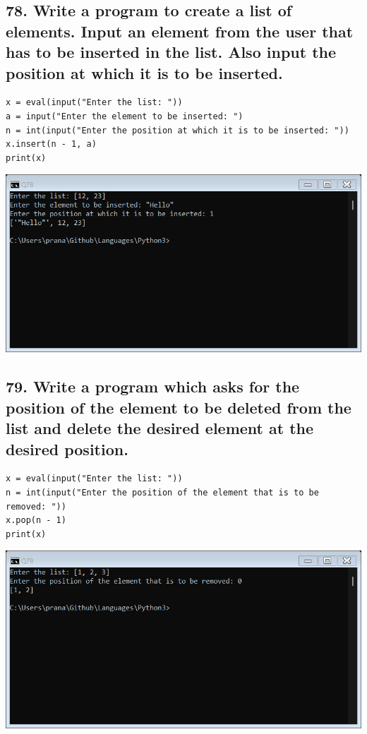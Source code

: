 \documentclass[12pt]{article}
\begin{document}
\subsection*{78. Write a program to create a list of elements. Input an element from the user that has to be inserted in the list. Also input the position at which it is to be inserted.}
\begin{verbatim}
x = eval(input("Enter the list: "))
a = input("Enter the element to be inserted: ")
n = int(input("Enter the position at which it is to be inserted: "))
x.insert(n - 1, a)
print(x)
\end{verbatim}
\includegraphics[width=\linewidth]{images/78.png}

\subsection*{79. Write a program which asks for the position of the element to be deleted from the list and delete the desired element at the desired position.}
\begin{verbatim}
x = eval(input("Enter the list: "))
n = int(input("Enter the position of the element that is to be removed: "))
x.pop(n - 1)
print(x)
\end{verbatim}
\includegraphics[width=\linewidth]{images/79.png}
\end{document}
